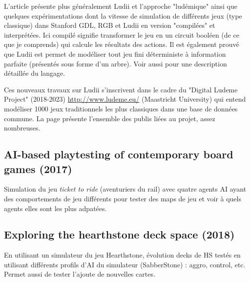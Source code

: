 \documentclass[a4paper,11pt]{article}
\begin{document}
L'article \cite{piette2019ludii} présente plus généralement Ludii  et l'approche "ludémique" ainsi que quelques expérimentations dont la vitesse de simulation de différents jeux (type classique)
dans Stanford GDL, RGB et Ludii  en version "compilées" et interprétées. Ici compilé signifie transformer le jeu en un circuit booléen (de ce que je comprends) qui calcule les résultats des actions. Il est également prouvé que Ludii est permet de modéliser tout jeu fini déterministe à information parfaite (présentés sous forme d'un arbre).
Voir aussi \cite{piette2021ludii} pour une description détaillée du langage.

Ces nouveaux travaux sur Ludii s'inscrivent dans le cadre du "Digital Ludeme Project" (2018-2023) \url{http://www.ludeme.eu/} (Maastricht University) qui entend modéliser 1000 jeux traditionnels les plus classiques dans une base de données commune. La page présente l'ensemble des publis liées au projet, assez nombreuses.



\subsection{AI-based playtesting of contemporary board games (2017) \cite{demesentier2017aibased}}


Simulation du jeu {\it ticket to ride} (aventuriers du rail) avec quatre agents AI ayant des comportements de jeu différents pour tester des maps de jeu et voir à quels agents elles sont les plus adpatées.



\subsection{Exploring the hearthstone deck space (2018) \cite{bhatt2018exploring} }

En utilisant un simulateur du jeu Hearthstone, évolution 
decks de HS testés en utilisant différents profils d'AI du simulateur (SabberStone) : aggro, control, etc. Permet aussi de tester l'ajoute de nouvelles cartes.




\end{document}
